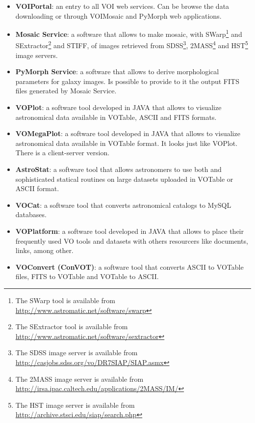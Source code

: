 \begin{itemize}
\item \textbf{VOIPortal}:
an entry to all VOI web services. Can be browse the data downloading or through
VOIMosaic and PyMorph web applications.

\item \textbf{Mosaic Service}:
a software that allows to make mosaic, with SWarp\footnote{The SWarp tool is
available from \url{http://www.astromatic.net/software/swarp}} and
SExtractor\footnote{The SExtractor tool is available from
\url{http://www.astromatic.net/software/sextractor}} and STIFF, of images
retrieved from SDSS\footnote{The SDSS image server is available from
\url{http://casjobs.sdss.org/vo/DR7SIAP/SIAP.asmx}}, 2MASS\footnote{The 2MASS
image server is available from
\url{http://irsa.ipac.caltech.edu/applications/2MASS/IM/}} and HST\footnote{The
HST image server is available from
\url{http://archive.stsci.edu/siap/search.php}} image servers.

\item \textbf{PyMorph Service}:
a software that allows to derive morphological parameters for galaxy images. Is
possible to provide to it the output FITS files generated by Mosaic Service.

\item \textbf{VOPlot}:
a software tool developed in JAVA that allows to visualize astronomical data
available in VOTable, ASCII and FITS formats.

\item \textbf{VOMegaPlot}:
a software tool developed in JAVA that allows to visualize astronomical data
available in VOTable format. It looks just like VOPlot. There is a client-server
version.

\item \textbf{AstroStat}:
a software tool that allows astronomers to use both and sophisticated statical
routines on large datasets uploaded in VOTable or ASCII format.

\item \textbf{VOCat}:
a software tool that converts astronomical catalogs to MySQL databases. 

\item \textbf{VOPlatform}:
a software tool developed in JAVA that allows to place their frequently used VO
tools and datasets with others resourcers like documents, links, among other.

\item \textbf{VOConvert (ConVOT)}:
a software tool that converts ASCII to VOTable files, FITS to VOTable and
VOTable to ASCII.


\end{itemize}
